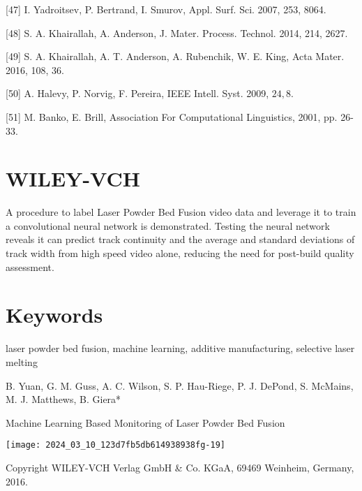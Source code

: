 \documentclass[10pt]{article}
\begin{document}
[47] I. Yadroitsev, P. Bertrand, I. Smurov, Appl. Surf. Sci. 2007, 253, 8064.

[48] S. A. Khairallah, A. Anderson, J. Mater. Process. Technol. 2014, 214, 2627.

[49] S. A. Khairallah, A. T. Anderson, A. Rubenchik, W. E. King, Acta Mater. 2016, 108, 36.

[50] A. Halevy, P. Norvig, F. Pereira, IEEE Intell. Syst. 2009, $24,8$.

[51] M. Banko, E. Brill, Association For Computational Linguistics, 2001, pp. 26-33.

\section*{WILEY-VCH}
A procedure to label Laser Powder Bed Fusion video data and leverage it to train a convolutional neural network is demonstrated. Testing the neural network reveals it can predict track continuity and the average and standard deviations of track width from high speed video alone, reducing the need for post-build quality assessment.

\section*{Keywords}
laser powder bed fusion, machine learning, additive manufacturing, selective laser melting

B. Yuan, G. M. Guss, A. C. Wilson, S. P. Hau-Riege, P. J. DePond, S. McMains, M. J. Matthews, B. Giera*

Machine Learning Based Monitoring of Laser Powder Bed Fusion

\begin{center}
\texttt{[image: 2024\_03\_10\_123d7fb5db614938938fg-19]}
\end{center}

Copyright WILEY-VCH Verlag GmbH \& Co. KGaA, 69469 Weinheim, Germany, 2016.
\end{document}
